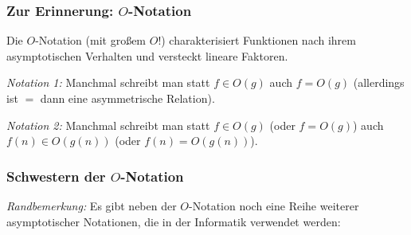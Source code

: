 \documentclass[aspectratio=1610,onlymath]{beamer}
\begin{document}
\begin{frame}\frametitle{Zur Erinnerung: $O$-Notation}

Die $O$-Notation (mit großem $O$!) charakterisiert Funktionen nach ihrem asymptotischen Verhalten und
versteckt lineare Faktoren.

\pause

\emph{Notation 1:} Manchmal schreibt man statt $f\in O(g)$ auch $f=O(g)$ (allerdings ist $=$ dann eine
asymmetrische Relation).\medskip

\emph{Notation 2:} Manchmal schreibt man statt $f\in O(g)$ (oder $f=O(g)$) auch $f(n)\in O(g(n))$ (oder $f(n)=O(g(n))$).


\end{frame}

\begin{frame}\frametitle{Schwestern der $O$-Notation}

\emph{Randbemerkung:} Es gibt neben der $O$-Notation noch eine Reihe weiterer
asymptotischer Notationen, die in der Informatik verwendet werden:\bigskip


\end{frame}
\end{document}
